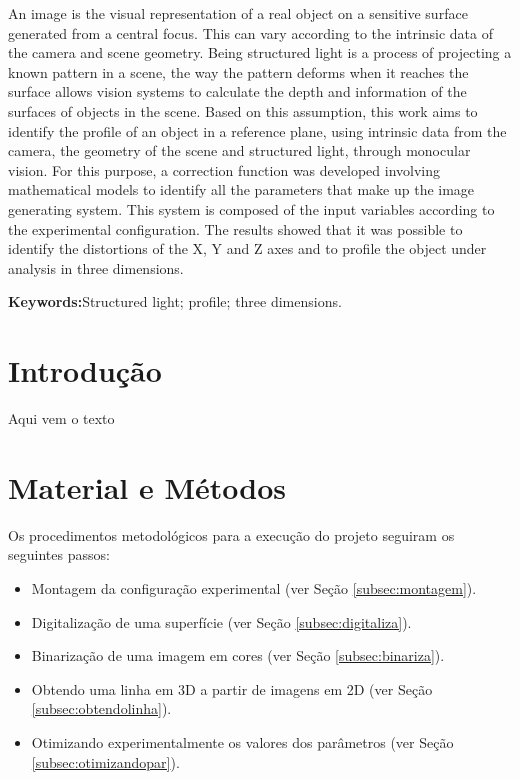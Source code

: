 \documentclass[a4paper, 12pt]{article}
\begin{document}
An image is the visual representation of a real object on a sensitive surface generated from a central focus. 
This can vary according to the intrinsic data of the camera and scene geometry. 
Being structured light is a process of projecting a known pattern in a scene, the way the pattern deforms when it reaches the surface allows vision systems to calculate the depth and information of the surfaces of objects in the scene. 
Based on this assumption, this work aims to identify the profile of an object in a reference plane, using intrinsic data from the camera, the geometry of the scene and structured light, through monocular vision. 
For this purpose, a correction function was developed involving mathematical models to identify all the parameters that make up the image generating system. 
This system is composed of the input variables according to the experimental configuration. 
The results showed that it was possible to identify the distortions of the X, Y and Z axes and to profile the object under analysis in three dimensions.

\textbf{Keywords:}Structured light; profile; three dimensions. 


\section{Introdução}

Aqui vem o texto


\section{Material e Métodos}

Os procedimentos metodológicos para a execução do projeto seguiram os seguintes passos:

\begin{itemize}
\item Montagem da configuração experimental (ver Seção \ref{subsec:montagem}).
\item Digitalização de uma superfície (ver Seção \ref{subsec:digitaliza}).
\item Binarização de uma imagem em cores (ver Seção \ref{subsec:binariza}).
\item Obtendo uma linha em 3D a partir de imagens em 2D (ver Seção \ref{subsec:obtendolinha}).
\item Otimizando experimentalmente os valores dos parâmetros (ver Seção \ref{subsec:otimizandopar}). 
\end{itemize}
\end{document}
